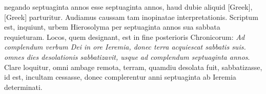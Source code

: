 negando septuaginta annos esse septuaginta annos, haud dubie
aliquid \textgreek{[Greek]}, \textgreek{[Greek]} parturitur.
Audiamus
caussam tam inopinatae interpretationis.
Scriptum est, inquiunt, urbem
Hierosolyma per septuaginta annos sua sabbata requieturam.
Locos, quem designant, est in fine posterioris Chronicorum:
\textit{Ad complendum verbum Dei in ore Ieremia,
 donec terra acquiescat sabbatis
suis. omnes dies desolationis sabbatizavit, usque ad complendum
septuaginta annos}.
{}
Clare loquitur, omni ambage remota, terram,
quamdiu desolata fuit, sabbatizasse, id est, incultam cessasse, donec
complerentur anni septuaginta ab Ieremia determinati.

